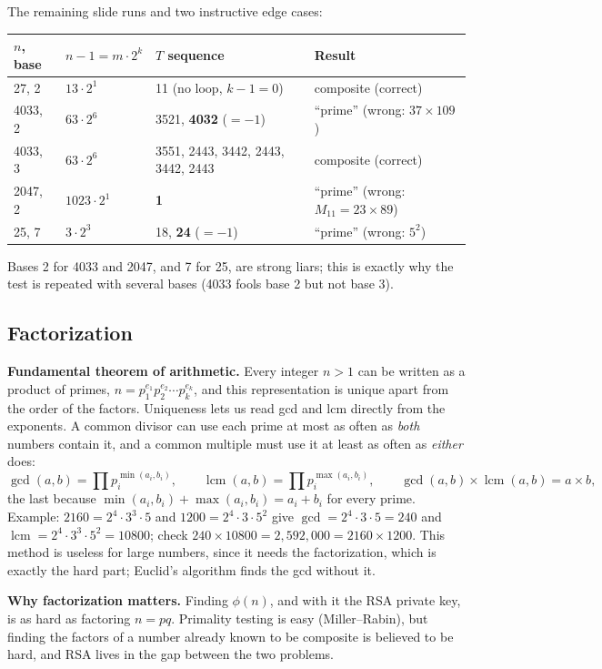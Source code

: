 The remaining slide runs and two instructive edge cases:
\begin{center}\small
\begin{tabular}{@{}llll@{}}
\toprule
$n$, base & $n - 1 = m \cdot 2^k$ & $T$ sequence & Result\\
\midrule
27, 2 & $13 \cdot 2^1$ & 11 (no loop, $k - 1 = 0$) & composite (correct)\\
4033, 2 & $63 \cdot 2^6$ & 3521, \textbf{4032} ($= -1$) & ``prime'' (wrong: $37 \times 109$)\\
4033, 3 & $63 \cdot 2^6$ & 3551, 2443, 3442, 2443, 3442, 2443 & composite (correct)\\
2047, 2 & $1023 \cdot 2^1$ & \textbf{1} & ``prime'' (wrong: $M_{11} = 23 \times 89$)\\
25, 7 & $3 \cdot 2^3$ & 18, \textbf{24} ($= -1$) & ``prime'' (wrong: $5^2$)\\
\bottomrule
\end{tabular}
\end{center}
Bases 2 for 4033 and 2047, and 7 for 25, are strong liars; this is exactly why the test is repeated with several bases (4033 fools base 2 but not base 3).

\subsection{Factorization}
\textbf{Fundamental theorem of arithmetic.} Every integer $n > 1$ can be written as a product of primes, $n = p_1^{e_1} p_2^{e_2} \cdots p_k^{e_k}$, and this representation is unique apart from the order of the factors. Uniqueness lets us read gcd and lcm directly from the exponents. A common divisor can use each prime at most as often as \emph{both} numbers contain it, and a common multiple must use it at least as often as \emph{either} does:
\[
\gcd(a, b) = \prod p_i^{\min(a_i, b_i)}, \qquad \operatorname{lcm}(a, b) = \prod p_i^{\max(a_i, b_i)}, \qquad \gcd(a, b) \times \operatorname{lcm}(a, b) = a \times b,
\]
the last because $\min(a_i, b_i) + \max(a_i, b_i) = a_i + b_i$ for every prime. Example: $2160 = 2^4 \cdot 3^3 \cdot 5$ and $1200 = 2^4 \cdot 3 \cdot 5^2$ give $\gcd = 2^4 \cdot 3 \cdot 5 = 240$ and $\operatorname{lcm} = 2^4 \cdot 3^3 \cdot 5^2 = 10800$; check $240 \times 10800 = 2{,}592{,}000 = 2160 \times 1200$. This method is useless for large numbers, since it needs the factorization, which is exactly the hard part; Euclid's algorithm finds the gcd without it.

\textbf{Why factorization matters.} Finding $\phi(n)$, and with it the RSA private key, is as hard as factoring $n = pq$. Primality testing is easy (Miller--Rabin), but finding the factors of a number already known to be composite is believed to be hard, and RSA lives in the gap between the two problems.

